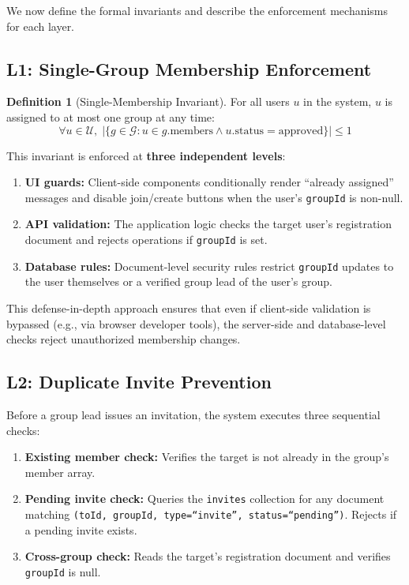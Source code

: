 \documentclass[11pt,a4paper]{article}
\theoremstyle{plain}
\theoremstyle{definition}
\newtheorem{definition}[theorem]{Definition}
\begin{document}
We now define the formal invariants and describe the enforcement mechanisms for each layer.

\subsection{L1: Single-Group Membership Enforcement}

\begin{definition}[Single-Membership Invariant]
For all users $u$ in the system, $u$ is assigned to at most one group at any time:
\begin{equation}
    \forall u \in \mathcal{U},\; |\{g \in \mathcal{G} : u \in g.\text{members} \wedge u.\text{status} = \text{approved}\}| \leq 1
\end{equation}
\end{definition}

This invariant is enforced at \textbf{three independent levels}:
\begin{enumerate}[noitemsep,topsep=3pt]
    \item \textbf{UI guards:} Client-side components conditionally render ``already assigned'' messages and disable join/create buttons when the user's \texttt{groupId} is non-null.
    \item \textbf{API validation:} The application logic checks the target user's registration document and rejects operations if \texttt{groupId} is set.
    \item \textbf{Database rules:} Document-level security rules restrict \texttt{groupId} updates to the user themselves or a verified group lead of the user's group.
\end{enumerate}

This defense-in-depth approach ensures that even if client-side validation is bypassed (e.g., via browser developer tools), the server-side and database-level checks reject unauthorized membership changes.

\subsection{L2: Duplicate Invite Prevention}

Before a group lead issues an invitation, the system executes three sequential checks:
\begin{enumerate}[noitemsep,topsep=3pt]
    \item \textbf{Existing member check:} Verifies the target is not already in the group's member array.
    \item \textbf{Pending invite check:} Queries the \texttt{invites} collection for any document matching \texttt{(toId, groupId, type=``invite'', status=``pending'')}. Rejects if a pending invite exists.
    \item \textbf{Cross-group check:} Reads the target's registration document and verifies \texttt{groupId} is null.
\end{enumerate}
\end{document}
